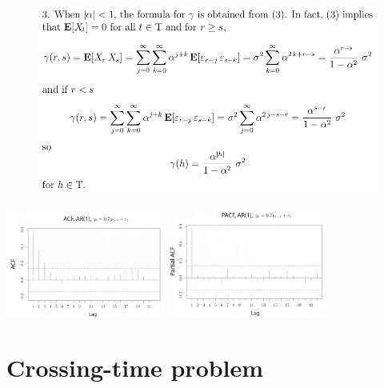 \documentclass[c, dvipsnames, 8pt]{beamer}
\begin{document}
\begin{frame}[shrink=5]
	
	
	
	\frametitle{\insertsection} 
	\begin{figure}
		\centering
		\includegraphics[width=0.7\linewidth]{screenshot030}
		\label{fig:screenshot001}
	\end{figure}
	
		\vfil
	\hfil\hfil\includegraphics[height=3.5cm]{screenshot031}\hfil\hfil
	\includegraphics[height=3.5cm]{screenshot032}\newline
	


\end{frame}


\section{Crossing-time problem}
\end{document}
